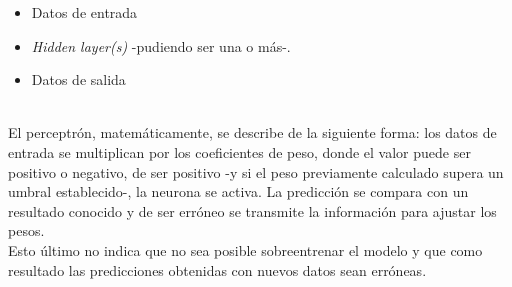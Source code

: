\documentclass[runningheads]{llncs}
\begin{document}
\begin{itemize}
    \begin{itemize}
        \item Datos de entrada
        \item \textit{Hidden layer(s)} -pudiendo ser una o más-.
        \item Datos de salida
    \end{itemize}\\
    
    El perceptrón, matemáticamente, se describe de la siguiente forma: los datos de entrada se multiplican por los coeficientes de peso, donde el valor puede ser positivo o negativo, de ser positivo -y si el peso previamente calculado supera un umbral establecido-,  la neurona se activa. La predicción se compara con un resultado conocido y de ser erróneo se transmite la información para ajustar los pesos.\\ 
    Esto último no indica que no sea posible sobreentrenar el modelo y que como resultado las predicciones obtenidas con nuevos datos sean erróneas. 
    
\end{itemize}

\newpage
\end{document}
